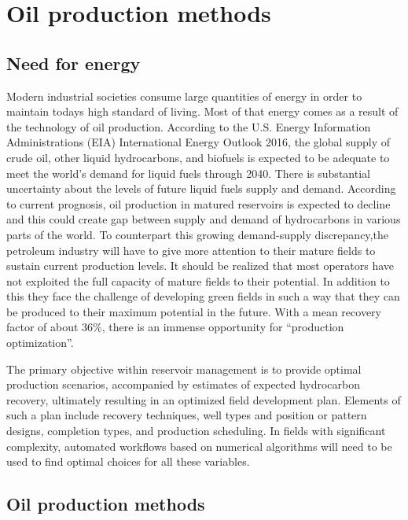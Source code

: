 \chapter{Oil production methods}

\section*{Need for energy}

Modern industrial societies consume large quantities of energy in order to 
maintain todays high standard of living. Most of that energy comes as a 
result of the technology of oil production.  According to the U.S. Energy 
Information Administrations (EIA) International Energy Outlook 2016, the global 
supply of crude oil, other liquid hydrocarbons, and biofuels is expected to be 
adequate to meet the world's demand for liquid fuels through 2040. There is 
substantial uncertainty about the levels of future liquid fuels supply and 
demand. According to current prognosis, oil production in matured reservoirs is 
expected to decline and this could create gap between supply and demand of 
hydrocarbons in various parts of the world. To counterpart
this growing demand-supply discrepancy,the petroleum industry will have to give more
attention to their mature fields to sustain current production levels. It should be
realized that most operators have not exploited the full capacity of mature fields
to their potential. In addition to this they face the challenge of developing green
fields in such a way that they can be produced to their maximum potential in
the future. With a mean recovery factor of about 36\%, there is an immense
opportunity for ``production optimization''.

The primary objective within reservoir management is to provide optimal
production scenarios, accompanied by estimates of expected hydrocarbon recovery,
ultimately resulting in an optimized field development plan. Elements of such a plan
include recovery techniques, well types and position or pattern designs, completion
types, and production scheduling. In fields with significant complexity, automated
workflows based on numerical algorithms will need to be used to find optimal
choices for all these variables.



\section{Oil production methods} \label{sec:OilProductionMethods}

